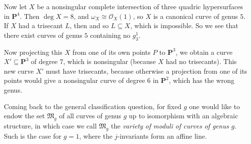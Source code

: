 {Now let $X$ be a nonsingular complete intersection of three quadric hypersurfaces in $\mathbf P^4$. Then $\deg X=8$, and $\omega_X\cong\mathcal O_X(1)$, so $X$ is a canonical curve of genus $5$. If $X$ had a trisecant $L$, then  and so $L\subseteq X$, which is impossible. So we see that there exist curves of genus $5$ containing no $g_3^1$.

Now projecting this $X$ from one of its own points $P$ to $\mathbf P^3$, we obtain a curve $X'\subseteq\mathbf P^3$ of degree $7$, which is nonsingular (because $X$ had no trisecants). This new curve $X'$ must have trisecants, because otherwise a projection from one of its points would give a nonsingular curve of degree $6$ in $\mathbf P^2$, which has the wrong genus. 

Coming back to the general classification question, for fixed $g$ one would like to endow the set $\mathfrak M_g$ of all curves of genus $g$ up to isomorphism with an algebraic structure, in which case we call $\mathfrak M_g$ the \emph{variety of moduli of curves of genus $g$}. Such is the case for $g=1$, where the $j$-invariants form an affine line.}
